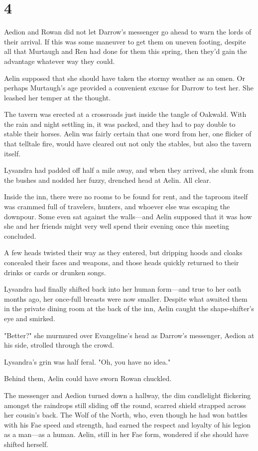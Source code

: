
\chapter{4}

Aedion and Rowan did not let Darrow's messenger go ahead to warn the lords of their arrival.
If this was some maneuver to get them on uneven footing, despite all that Murtaugh and Ren had done for them this spring, then they'd gain the advantage whatever way they could.

Aelin supposed that she should have taken the stormy weather as an omen.
Or perhaps Murtaugh's age provided a convenient excuse for Darrow to test her.
She leashed her temper at the thought.

The tavern was erected at a crossroads just inside the tangle of Oakwald.
With the rain and night settling in, it was packed, and they had to pay double to stable their horses. 
Aelin was fairly certain that one word from her, one flicker of that telltale fire, would have cleared out not only the stables, but also the tavern itself.

Lysandra had padded off half a mile away, and when they arrived, she slunk from the bushes and nodded her fuzzy, drenched head at Aelin.
All clear.

Inside the inn, there were no rooms to be found for rent, and the taproom itself was crammed full of travelers, hunters, and whoever else was escaping the downpour. 
Some even sat against the walls---and Aelin supposed that it was how she and her friends might very well spend their evening once this meeting concluded.

A few heads twisted their way as they entered, but dripping hoods and cloaks concealed their faces and weapons, and those heads quickly returned to their drinks or cards or drunken songs.

Lysandra had finally shifted back into her human form---and true to her oath months ago, her once-full breasts were now smaller. 
Despite what awaited them in the private dining room at the back of the inn, Aelin caught the shape-shifter's eye and smirked.

"Better?"
she murmured over Evangeline's head as Darrow's messenger, Aedion at his side, strolled through the crowd.

Lysandra's grin was half feral. 
"Oh, you have no idea."

Behind them, Aelin could have sworn Rowan chuckled.

The messenger and Aedion turned down a hallway, the dim candlelight flickering amongst the raindrops still sliding off the round, scarred shield strapped across her cousin's back. 
The Wolf of the North, who, even though he had won battles with his Fae speed and strength, had earned the respect and loyalty of his legion as a man---as a human. 
Aelin, still in her Fae form, wondered if she should have shifted herself.

